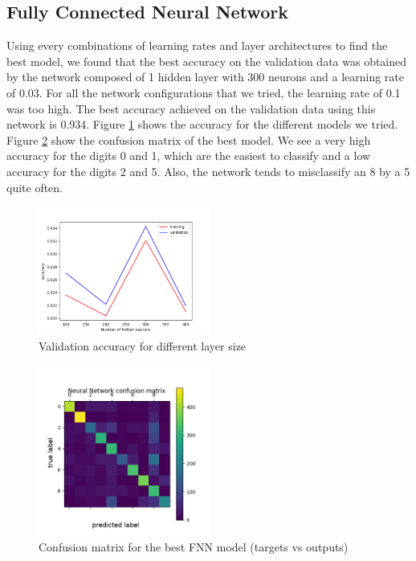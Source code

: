 \documentclass[letterpaper, 10 pt, conference]{ieeeconf}  %
\begin{document}
\subsection{Fully Connected Neural Network}
Using every combinations of learning rates and layer architectures to find the best model, we found that the best accuracy on the validation data was obtained by the network composed of 1 hidden layer with 300 neurons and a learning rate of 0.03. For all the network configurations that we tried, the learning rate of 0.1 was too high. The best accuracy achieved on the validation data using this network is 0.934. Figure \ref{fig:fnntune} shows the accuracy for the different models we tried. Figure \ref{fig:fnnconf} show the confusion matrix of the best model. We see a very high accuracy for the digits 0 and 1, which are the easiest to classify and a low accuracy for the digits 2 and 5. Also, the network tends to misclassify an 8 by a 5 quite often.

\begin{figure}[h]
	\begin{center}
			\includegraphics[width=0.5\textwidth]{figures/fnn_tune.png}  %
		\caption{Validation accuracy for different layer size}
		\label{fig:fnntune}
	\end{center}
\end{figure}
\begin{figure}[h]
	\begin{center}
			\includegraphics[width=0.5\textwidth]{figures/fnn_conf.png}  %
		\caption{Confusion matrix for the best FNN model (targets vs outputs)}
		\label{fig:fnnconf}
	\end{center}
\end{figure}
\end{document}
